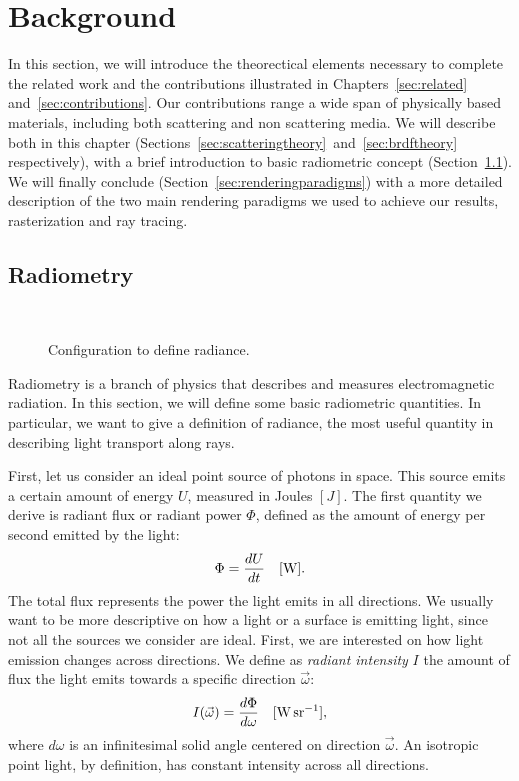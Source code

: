 \chapter{Background}
\label{sec:background}

In this section, we will introduce the theorectical elements necessary to complete the related work and the contributions illustrated in Chapters~\ref{sec:related} and~\ref{sec:contributions}. Our contributions range a wide span of physically based materials, including both scattering and non scattering media. We will describe both in this chapter (Sections~\ref{sec:scatteringtheory}~and~\ref{sec:brdftheory} respectively), with a brief introduction to basic radiometric concept (Section~\ref{sec:radiometry}). We will finally conclude (Section~\ref{sec:renderingparadigms}) with a more detailed description of the two main rendering paradigms we used to achieve our results, rasterization and ray tracing.

\section{Radiometry}
\label{sec:radiometry}
\begin{figure}
\centering
   \def\svgwidth{0.4\textwidth}
    \\
\caption{Configuration to define radiance.} %
\label{fig:radiance}
\end{figure}
Radiometry is a branch of physics that describes and measures electromagnetic radiation. In this section, we will define some basic radiometric quantities. In particular, we want to give a definition of radiance, the most useful quantity in describing light transport along rays.

First, let us consider an ideal point source of photons in space. This source emits a certain amount of energy $U$, measured in Joules $[J]$. The first quantity we derive is radiant flux or radiant power $\Phi$, defined as the amount of energy per second emitted by the light:
\begin{equation*}
\Phi = \frac{d U}{d t}  \ \ \ [\SI{}{\watt}].
\end{equation*}
The total flux represents the power the light emits in all directions. We usually want to be more descriptive on how a light or a surface is emitting light, since not all the sources we consider are ideal. First, we are interested on how light emission changes across directions.  We  define as \emph{radiant intensity} $I$ the amount of flux the light emits towards a specific direction $\vec{\omega}$:
\begin{equation*}
I(\vec{\omega}) = \frac{d \Phi}{d \omega}  \siunit{\watt \per \steradian},
\end{equation*}   
where $d \omega$ is an infinitesimal solid angle centered on direction $\vec{\omega}$. An isotropic point light, by definition, has constant intensity across all directions.

